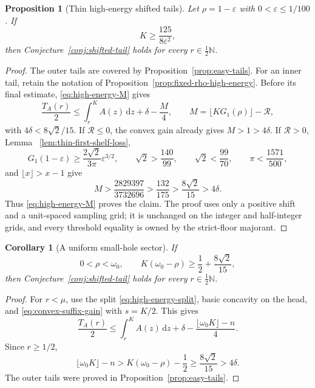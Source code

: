 \documentclass[11pt]{article}
\newtheorem{proposition}[theorem]{Proposition}
\newtheorem{corollary}[theorem]{Corollary}
\theoremstyle{remark}
\newcommand{\N}{\mathbb N}
\newcommand{\dd}{\,\mathrm d}
\begin{document}
\begin{proposition}[Thin high-energy shifted tails]
\label{prop:thin-high-energy}
Let $\rho=1-\varepsilon$ with
$0<\varepsilon\leq1/100$.  If
\begin{equation}
 K\geq\frac{125}{8\varepsilon^2},
 \label{eq:thin-high-energy-threshold}
\end{equation}
then Conjecture~\ref{conj:shifted-tail} holds for every
$r\in\tfrac12\N$.
\end{proposition}

\begin{proof}
The outer tails are covered by Proposition~\ref{prop:easy-tails}.  For an
inner tail, retain the notation of
Proposition~\ref{prop:fixed-rho-high-energy}.  Before its final estimate,
\eqref{eq:high-energy-M} gives
\[
 \frac{T_A(r)}2
 \leq\int_r^KA(z)\dd z+\delta-\frac M4,
 \qquad
 M=\lfloor KG_1(\rho)\rfloor-\mathcal R,
\]
with $4\delta<8\sqrt2/15$.  If $\mathcal R\leq0$, the convex gain already
gives $M>1>4\delta$.  If $\mathcal R>0$, Lemma
~\ref{lem:thin-first-shelf-loss},
\[
 G_1(1-\varepsilon)
 \geq\frac{2\sqrt2}{3\pi}\varepsilon^{3/2},
 \qquad
 \sqrt2>\frac{140}{99},
 \qquad
 \sqrt2<\frac{99}{70},
 \qquad
 \pi<\frac{1571}{500},
\]
and $\lfloor x\rfloor>x-1$ give
\[
 M>
 \frac{2829397}{3732696}
 >\frac{132}{175}
 >\frac{8\sqrt2}{15}>4\delta.
\]
Thus \eqref{eq:high-energy-M} proves the claim.  The proof uses only a
positive shift and a unit-spaced sampling grid; it is unchanged on the
integer and half-integer grids, and every threshold equality is owned by
the strict-floor majorant.
\end{proof}

\begin{corollary}[A uniform small-hole sector]
\label{cor:small-hole-sector}
If
\[
 0<\rho<\omega_0,
 \qquad
 K(\omega_0-\rho)\geq\frac12+\frac{8\sqrt2}{15},
\]
then Conjecture~\ref{conj:shifted-tail} holds for every
$r\in\tfrac12\N$.
\end{corollary}

\begin{proof}
For $r<\mu$, use the split \eqref{eq:high-energy-split}, basic concavity
on the head, and \eqref{eq:convex-suffix-gain} with $s=K/2$.  This gives
\[
 \frac{T_A(r)}2\leq\int_r^K A(z)\dd z+\delta
 -\frac{\lfloor\omega_0K\rfloor-n}{4}.
\]
Since $r\geq1/2$,
\[
 \lfloor\omega_0K\rfloor-n
 >K(\omega_0-\rho)-\frac12
 \geq\frac{8\sqrt2}{15}>4\delta.
\]
The outer tails were proved in Proposition~\ref{prop:easy-tails}.
\end{proof}
\end{document}
